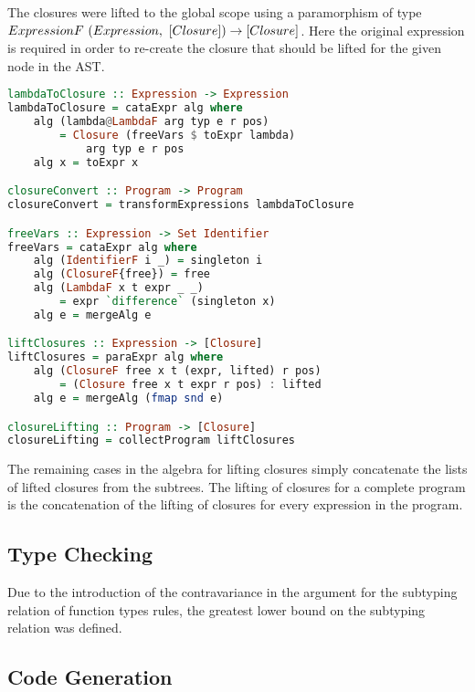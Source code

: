 The closures were lifted to the global scope using a paramorphism of type $ExpressionF\ (Expression,\\\ [Closure]) \rightarrow [Closure]$. Here the original expression is required in order to re-create the closure that should be lifted for the given node in the AST.

\begin{lstlisting}[language=Haskell]
lambdaToClosure :: Expression -> Expression
lambdaToClosure = cataExpr alg where
    alg (lambda@LambdaF arg typ e r pos)
        = Closure (freeVars $ toExpr lambda)
        	arg typ e r pos
    alg x = toExpr x

closureConvert :: Program -> Program
closureConvert = transformExpressions lambdaToClosure

freeVars :: Expression -> Set Identifier
freeVars = cataExpr alg where
    alg (IdentifierF i _) = singleton i
    alg (ClosureF{free}) = free
    alg (LambdaF x t expr _ _)
    	= expr `difference` (singleton x)
    alg e = mergeAlg e

liftClosures :: Expression -> [Closure]
liftClosures = paraExpr alg where
    alg (ClosureF free x t (expr, lifted) r pos)
        = (Closure free x t expr r pos) : lifted
    alg e = mergeAlg (fmap snd e)

closureLifting :: Program -> [Closure]
closureLifting = collectProgram liftClosures
\end{lstlisting}

The remaining cases in the algebra for lifting closures simply concatenate the lists of lifted closures from the subtrees. The lifting of closures for a complete program is the concatenation of the lifting of closures for every expression in the program. 

\subsection{Type Checking}

Due to the introduction of the contravariance in the argument for the subtyping relation of function types rules, the greatest lower bound on the subtyping relation was defined.

\subsection{Code Generation} \label{sec:codegen}

